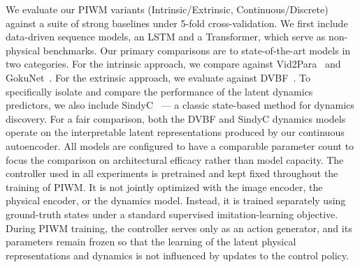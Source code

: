 \documentclass[sigconf]{acmart}
\begin{document}



We evaluate our PIWM variants (Intrinsic/Extrinsic, Continuous/Discrete) against a suite of strong baselines under 5-fold cross-validation. We first include data-driven sequence models, an LSTM and a Transformer, which serve as non-physical benchmarks. Our primary comparisons are to state-of-the-art models in two categories. For the {intrinsic} approach, we compare against Vid2Para~\cite[]{asenov2019vid2param} and GokuNet~\cite[]{linial_generative_2021}. For the {extrinsic} approach, we evaluate against DVBF~\cite[]{karl2016deep}. To specifically isolate and compare the performance of the latent dynamics predictors, we also include SindyC~\cite[]{BRUNTON2016710} --- a classic state-based method for dynamics discovery. For a fair comparison, both the DVBF and SindyC dynamics models operate on the interpretable latent representations produced by our continuous autoencoder. All models are configured to have a comparable parameter count to focus the comparison on architectural efficacy rather than model capacity. The controller used in all experiments is pretrained and kept fixed throughout the training of PIWM. It is not jointly optimized with the image encoder, the physical encoder, or the dynamics model. Instead, it is trained separately using ground-truth states under a standard supervised imitation-learning objective. During PIWM training, the controller serves only as an action generator, and its parameters remain frozen so that the learning of the latent physical representations and dynamics is not influenced by updates to the control policy.

\end{document}
